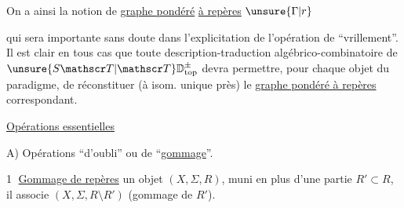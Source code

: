 
On a ainsi la notion de \uline{graphe pondéré}  \uline{à repères} $\unsure{\Gamma|r}$



qui sera importante sans doute dans l'explicitation de l'opération de ``vrillement''. Il est clair en tous cas que toute description-traduction algébrico-combinatoire de $\unsure{S\mathscr T|\mathscr T}\mathbb D_{\mathrm{top}}^{\pm}$ devra permettre, pour chaque objet du  paradigme, de réconstituer (à isom. unique près) le \uline{graphe pondéré à repères} correspondant.


\uline{Opérations essentielles}

A) Opérations ``d'oubli'' ou de ``\uline{gommage}''.

\textcircled{1} \uline{Gommage de repères} \quad {} un objet $(X,\Sigma,R)$, muni en plus d'une partie $R'\subset R$, il associe $(X,\Sigma,R\setminus R')$ (gommage de $R'$).

